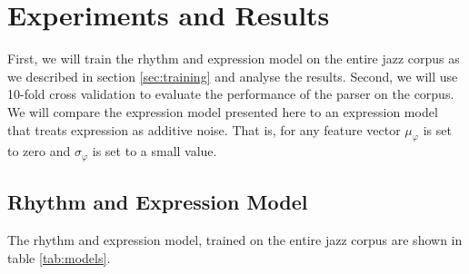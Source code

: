 \chapter{Experiments and Results}
\label{sec:results}

First, we will train the rhythm and expression model on the entire jazz corpus as we described in section \ref{sec:training} and analyse the results. Second, we will use 10-fold cross validation to evaluate the performance of the parser on the corpus. We will compare the expression model presented here to an expression model that treats expression as additive noise. That is, for any feature vector $\mu_\varphi$ is set to zero and $\sigma_\varphi$ is set to a small value.

\section{Rhythm and Expression Model}

The rhythm and expression model, trained on the entire jazz corpus are shown in table \ref{tab:models}. 

